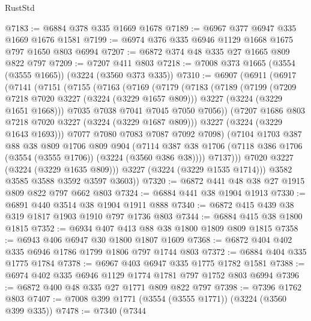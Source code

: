 \begin{lexlean}{RustStd}
\begin{coremodule}
@7183 := @6884 @378 @335 @1669 @1678
@7189 := @6967 @377 @6947 @335 @1669 @1676 @1581
@7199 := @6974 @376 @335 @6946 @1129 @1668 @1675 @797 @1650 @803 @6994
@7207 := @6872 @374 @48 @335 @27 @1665 @809 @822 @797
@7209 := @7207 @411 @803
@7218 := @7008 @373 @1665 (@3554 (@3555 @1665)) (@3224 (@3560 @373 @335))
@7310 := @6907
    (@6911
      (@6917
        (@7141
          (@7151
            (@7155
              (@7163
                (@7169
                  (@7179
                    (@7183
                      (@7189
                        (@7199
                          (@7209 @7218 @7020 @3227 (@3224 (@3229 @1657 @809)))
                          @3227
                          (@3224 (@3229 @1651 @1668)))
                        @7035
                        @7038
                        @7041
                        @7045
                        @7050
                        @7056))
                    (@7207 @1686 @803 @7218 @7020 @3227 (@3224 (@3229 @1687 @809)))
                    @3227
                    (@3224 (@3229 @1643 @1693)))
                  @7077
                  @7080
                  @7083
                  @7087
                  @7092
                  @7098)
                (@7104
                  @1703
                  @387
                  @88
                  @38
                  @809
                  @1706
                  @809
                  @904
                  (@7114
                    @387
                    @38
                    @1706
                    (@7118 @386 @1706 (@3554 (@3555 @1706)) (@3224 (@3560 @386 @38))))
                  @7137)))
            @7020
            @3227
            (@3224 (@3229 @1635 @809)))
          @3227
          (@3224 (@3229 @1535 @1714)))
        @3582
        @3585
        @3588
        @3592
        @3597
        @3603))
@7320 := @6872 @441 @48 @38 @27 @1915 @809 @822 @797 @662 @803
@7324 := @6884 @441 @38 @1904 @1913
@7330 := @6891 @440 @3514 @38 @1904 @1911 @888
@7340 := @6872 @415 @439 @38 @319 @1817 @1903 @1910 @797 @1736 @803
@7344 := @6884 @415 @38 @1800 @1815
@7352 := @6934 @407 @413 @88 @38 @1800 @1809 @809 @1815
@7358 := @6943 @406 @6947 @30 @1800 @1807 @1609
@7368 := @6872 @404 @402 @335 @6946 @1786 @1799 @1806 @797 @1744 @803
@7372 := @6884 @404 @335 @1775 @1784
@7378 := @6967 @403 @6947 @335 @1775 @1782 @1581
@7388 := @6974 @402 @335 @6946 @1129 @1774 @1781 @797 @1752 @803 @6994
@7396 := @6872 @400 @48 @335 @27 @1771 @809 @822 @797
@7398 := @7396 @1762 @803
@7407 := @7008 @399 @1771 (@3554 (@3555 @1771)) (@3224 (@3560 @399 @335))
@7478 := @7340
    (@7344

\end{coremodule}
\end{lexlean}
